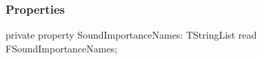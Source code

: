 \documentclass{report}
\newif\ifpdf
\begin{document}
\subsubsection*{\large{\textbf{Properties}}\normalsize\hspace{1ex}\hfill}
\begin{list}{}{
\setlength{\itemindent}{0cm}
\setlength{\listparindent}{0cm}
\setlength{\leftmargin}{\evensidemargin}
\addtolength{\leftmargin}{\tmplength}
\settowidth{\labelsep}{X}
\addtolength{\leftmargin}{\labelsep}
\setlength{\labelwidth}{\tmplength}
}
\label{ok_nested_1.TRepoSoundEngine-SoundImportanceNames}
\item[\textbf{SoundImportanceNames}\hfill]
\ifpdf
\begin{flushleft}
\fi
\begin{ttfamily}
private property SoundImportanceNames: TStringList read FSoundImportanceNames;\end{ttfamily}

\ifpdf
\end{flushleft}
\fi


\par  \end{list}
\end{document}
